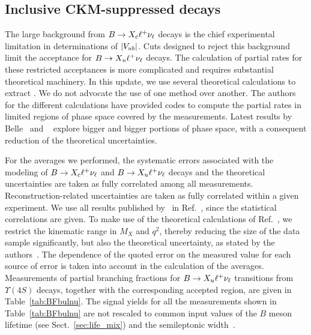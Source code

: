 \subsection{Inclusive CKM-suppressed decays}
\label{slbdecays_b2uincl}
The large background from $B\to X_c\ell^+\nu_\ell$ decays is the chief
experimental limitation in determinations of $|V_{ub}|$.  Cuts designed to
reject this background limit the acceptance for $B\to X_u\ell^+\nu_\ell$
decays. The calculation of partial rates for these restricted
acceptances is more complicated and requires substantial theoretical machinery.
In this update, we use several theoretical calculations
to extract \vub. We do not advocate the use of one method over another.
The authors for the different calculations have provided 
codes to compute the partial rates in limited regions of phase space covered by the measurements. 
Latest results by Belle~\cite{ref:belle-multivariate} and \babar~\cite{Lees:2011fv} 
explore bigger and bigger portions of phase space, with a consequent reduction of the theoretical 
uncertainties. 

For the averages we performed, the systematic errors associated with the
modeling of $B\to X_c\ell^+\nu_\ell$ and $B\to X_u\ell^+\nu_\ell$ decays and the theoretical
uncertainties are taken as fully correlated among all measurements.
Reconstruction-related uncertainties are taken as fully correlated within a given experiment.
We use all results published by \babar\ in Ref.~\cite{Lees:2011fv}, since the 
statistical correlations are given. 
To make use of the theoretical calculations of Ref.~\cite{ref:BLL}, we restrict the
kinematic range in $M_X$ and $q^2$, thereby reducing the size of the data
sample significantly, but also the theoretical uncertainty, as stated by the
authors~\cite{ref:BLL}.
The dependence of the quoted error on the measured value for each source of error
is taken into account in the calculation of the averages.
Measurements of partial branching fractions for $B\to X_u\ell^+\nu_\ell$
transitions from $\Upsilon(4S)$ decays, together with the corresponding accepted region, 
are given in Table~\ref{tab:BFbulnu}.  
The signal yields for all the measurements shown in Table~\ref{tab:BFbulnu}
are not rescaled to common input values of the $B$ meson lifetime (see Sect.~\ref{sec:life_mix})
and the semileptonic width~\cite{PDG_2008}.

